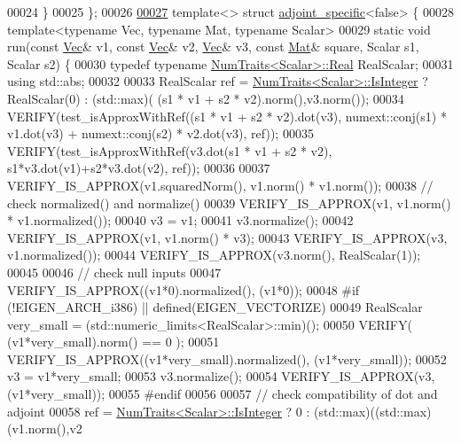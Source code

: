 \begin{DoxyCode}
00024   \}
00025 \};
00026 
\hyperlink{structadjoint__specific_3_01false_01_4}{00027} \textcolor{keyword}{template}<> \textcolor{keyword}{struct }\hyperlink{structadjoint__specific}{adjoint\_specific}<false> \{
00028   \textcolor{keyword}{template}<\textcolor{keyword}{typename} Vec, \textcolor{keyword}{typename} Mat, \textcolor{keyword}{typename} Scalar>
00029   \textcolor{keyword}{static} \textcolor{keywordtype}{void} run(\textcolor{keyword}{const} \hyperlink{group___core___module_class_eigen_1_1_matrix}{Vec}& v1, \textcolor{keyword}{const} \hyperlink{group___core___module_class_eigen_1_1_matrix}{Vec}& v2, \hyperlink{group___core___module_class_eigen_1_1_matrix}{Vec}& v3, \textcolor{keyword}{const} \hyperlink{group___core___module}{Mat}& square, Scalar s1, Scalar 
      s2) \{
00030     \textcolor{keyword}{typedef} \textcolor{keyword}{typename} \hyperlink{group___core___module_struct_eigen_1_1_num_traits}{NumTraits<Scalar>::Real} RealScalar;
00031     \textcolor{keyword}{using} std::abs;
00032     
00033     RealScalar ref = \hyperlink{group___core___module_struct_eigen_1_1_num_traits}{NumTraits<Scalar>::IsInteger} ? RealScalar(0) : (std::max)(
      (s1 * v1 + s2 * v2).norm(),v3.norm());
00034     VERIFY(test\_isApproxWithRef((s1 * v1 + s2 * v2).dot(v3),     numext::conj(s1) * v1.dot(v3) + 
      numext::conj(s2) * v2.dot(v3), ref));
00035     VERIFY(test\_isApproxWithRef(v3.dot(s1 * v1 + s2 * v2),       s1*v3.dot(v1)+s2*v3.dot(v2), ref));
00036   
00037     VERIFY\_IS\_APPROX(v1.squaredNorm(),                v1.norm() * v1.norm());
00038     \textcolor{comment}{// check normalized() and normalize()}
00039     VERIFY\_IS\_APPROX(v1, v1.norm() * v1.normalized());
00040     v3 = v1;
00041     v3.normalize();
00042     VERIFY\_IS\_APPROX(v1, v1.norm() * v3);
00043     VERIFY\_IS\_APPROX(v3, v1.normalized());
00044     VERIFY\_IS\_APPROX(v3.norm(), RealScalar(1));
00045 
00046     \textcolor{comment}{// check null inputs}
00047     VERIFY\_IS\_APPROX((v1*0).normalized(), (v1*0));
00048 \textcolor{preprocessor}{#if (!EIGEN\_ARCH\_i386) || defined(EIGEN\_VECTORIZE)}
00049     RealScalar very\_small = (std::numeric\_limits<RealScalar>::min)();
00050     VERIFY( (v1*very\_small).norm() == 0 );
00051     VERIFY\_IS\_APPROX((v1*very\_small).normalized(), (v1*very\_small));
00052     v3 = v1*very\_small;
00053     v3.normalize();
00054     VERIFY\_IS\_APPROX(v3, (v1*very\_small));
00055 \textcolor{preprocessor}{#endif}
00056     
00057     \textcolor{comment}{// check compatibility of dot and adjoint}
00058     ref = \hyperlink{group___core___module_struct_eigen_1_1_num_traits}{NumTraits<Scalar>::IsInteger} ? 0 : (std::max)((std::max)(v1.norm(),v2

\end{DoxyCode}
